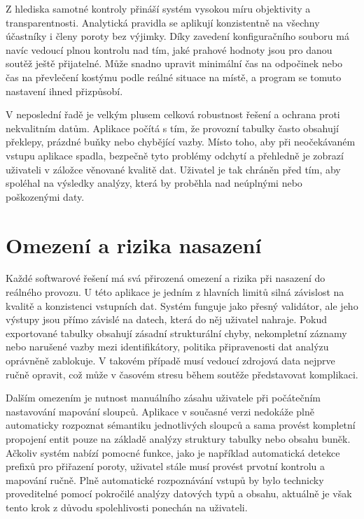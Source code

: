 \documentclass[czech, kiv, ba, he, iso690alph, pdf]{fasthesis}
\begin{document}
			Z hlediska samotné kontroly přináší systém vysokou míru objektivity a transparentnosti. Analytická pravidla se aplikují konzistentně na všechny účastníky i členy poroty bez výjimky. Díky zavedení konfiguračního souboru má navíc vedoucí plnou kontrolu nad tím, jaké prahové hodnoty jsou pro danou soutěž ještě přijatelné. Může snadno upravit minimální čas na odpočinek nebo čas na převlečení kostýmu podle reálné situace na místě, a program se tomuto nastavení ihned přizpůsobí.
	
			V neposlední řadě je velkým plusem celková robustnost řešení a ochrana proti nekvalitním datům. Aplikace počítá s tím, že provozní tabulky často obsahují překlepy, prázdné buňky nebo chybějící vazby. Místo toho, aby při neočekávaném vstupu aplikace spadla, bezpečně tyto problémy odchytí a přehledně je zobrazí uživateli v záložce věnované kvalitě dat. Uživatel je tak chráněn před tím, aby spoléhal na výsledky analýzy, která by proběhla nad neúplnými nebo poškozenými daty.
	
		\section{Omezení a rizika nasazení}
			Každé softwarové řešení má svá přirozená omezení a rizika při nasazení do reálného provozu. U této aplikace je jedním z hlavních limitů silná závislost na kvalitě a konzistenci vstupních dat. Systém funguje jako přesný validátor, ale jeho výstupy jsou přímo závislé na datech, která do něj uživatel nahraje. Pokud exportované tabulky obsahují zásadní strukturální chyby, nekompletní záznamy nebo narušené vazby mezi identifikátory, politika připravenosti dat analýzu oprávněně zablokuje. V takovém případě musí vedoucí zdrojová data nejprve ručně opravit, což může v časovém stresu během soutěže představovat komplikaci.
	
			Dalším omezením je nutnost manuálního zásahu uživatele při počátečním nastavování mapování sloupců. Aplikace v současné verzi nedokáže plně automaticky rozpoznat sémantiku jednotlivých sloupců a sama provést kompletní propojení entit pouze na základě analýzy struktury tabulky nebo obsahu buněk. Ačkoliv systém nabízí pomocné funkce, jako je například automatická detekce prefixů pro přiřazení poroty, uživatel stále musí provést prvotní kontrolu a mapování ručně. Plně automatické rozpoznávání vstupů by bylo technicky proveditelné pomocí pokročilé analýzy datových typů a obsahu, aktuálně je však tento krok z důvodu spolehlivosti ponechán na uživateli.
	
\end{document}
